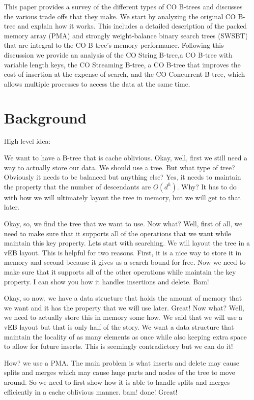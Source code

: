 \documentclass{style}
\begin{document}
This paper provides a survey of the different types of CO B-trees and
discusses the various trade offs that they make. We start by analyzing the
original CO B-tree and explain how it works. This includes a detailed
description of the packed memory array (PMA) and strongly weight-balance
binary search trees (SWSBT) that are integral to the CO B-tree's memory
performance. Following this discussion we provide an analysis of the CO String
B-tree,a CO B-tree with variable length keys, the CO Streaming B-tree, a CO
B-tree that improves the cost of insertion at the expense of search, and the
CO Concurrent B-tree, which allows multiple processes to access the data at
the same time.

\section{Background}




High level idea:

We want to have a B-tree that is cache oblivious. Okay, well, first we still
need a way to actually store our data. We should use a tree. But what type of
tree? Obviously it needs to be balanced but anything else? Yes, it needs to
maintain the property that the number of descendants are $O(d^h)$. Why? It has
to do with how we will ultimately layout the tree in memory, but we will get
to that later.

Okay, so, we find the tree that we want to use. Now what? Well, first of all,
we need to make sure that it supports all of the operations that we want while
maintain this key property. Lets start with searching. We will layout the tree
in a vEB layout. This is helpful for two reasons. First, it is a nice way to
store it in memory and second because it gives us a search bound for free. Now
we need to make sure that it supports all of the other operations while
maintain the key property. I can show you how it handles insertions and
delete. Bam!

Okay, so now, we have a data structure that holds the amount of memory that we
want and it has the property that we will use later. Great! Now what? Well, we
need to actually store this in memory some how. We said that we will use a vEB
layout but that is only half of the story. We want a data structure that
maintain the locality of as many elements as once while also keeping extra
space to allow for future inserts. This is seemingly contradictory but we can
do it!

How? we use a PMA. The main problem is what inserts and delete may cause
splits and merges which may cause huge parts and nodes of the tree to move
around. So we need to first show how it is able to handle splits and merges
efficiently in a cache oblivious manner. bam! done! Great!
\end{document}
